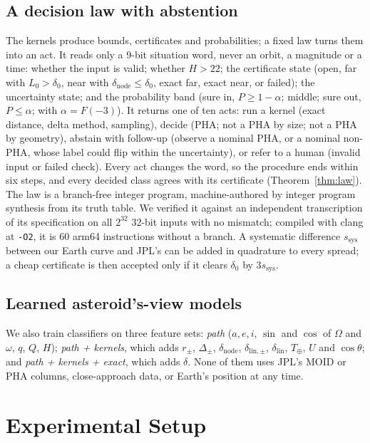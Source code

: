 \documentclass[conference]{IEEEtran}
\begin{document}
\subsection{A decision law with abstention}
\label{sec:law}
The kernels produce bounds, certificates and probabilities; a fixed law turns them into an act. It reads only a 9-bit situation word, never an orbit, a magnitude or a time: whether the input is valid; whether $H > 22$; the certificate state (open, far with $L_0 > \delta_0$, near with $\delta_{\mathrm{node}} \le \delta_0$, exact far, exact near, or failed); the uncertainty state; and the probability band (sure in, $P \ge 1 - \alpha$; middle; sure out, $P \le \alpha$; with $\alpha = F(-3)$). It returns one of ten acts: run a kernel (exact distance, delta method, sampling), decide (PHA; not a PHA by size; not a PHA by geometry), abstain with follow-up (observe a nominal PHA, or a nominal non-PHA, whose label could flip within the uncertainty), or refer to a human (invalid input or failed check). Every act changes the word, so the procedure ends within six steps, and every decided class agrees with its certificate (Theorem~\ref{thm:law}). The law is a branch-free integer program, machine-authored by integer program synthesis from its truth table. We verified it against an independent transcription of its specification on all $2^{32}$ 32-bit inputs with no mismatch; compiled with clang at \texttt{-O2}, it is 60 arm64 instructions without a branch. A systematic difference $s_{\mathrm{sys}}$ between our Earth curve and JPL's can be added in quadrature to every spread; a cheap certificate is then accepted only if it clears $\delta_0$ by $3s_{\mathrm{sys}}$.

\subsection{Learned asteroid's-view models}
We also train classifiers on three feature sets: \emph{path} ($a, e, i$, $\sin$ and $\cos$ of $\Omega$ and $\omega$, $q$, $Q$, $H$); \emph{path + kernels}, which adds $r_\pm$, $\Delta_\pm$, $\delta_{\mathrm{node}}$, $\delta_{\mathrm{lin},\pm}$, $\delta_{\mathrm{lin}}$, $T_\oplus$, $U$ and $\cos\theta$; and \emph{path + kernels + exact}, which adds $\delta$. None of them uses JPL's MOID or PHA columns, close-approach data, or Earth's position at any time.

\section{Experimental Setup}
\end{document}
